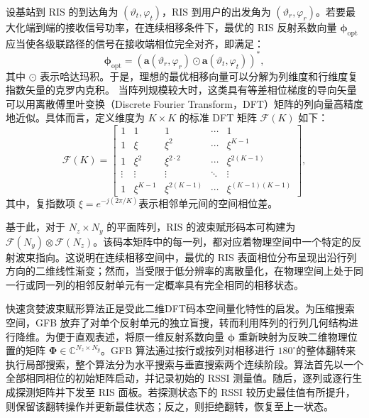设基站到 RIS 的到达角为 $(\vartheta_t, \varphi_t)$，RIS 到用户的出发角为 $(\vartheta_r, \varphi_r)$。若要最大化端到端的接收信号功率，在连续相移条件下，最优的 RIS 反射系数向量 $\bm{\phi}_{\text{opt}}$ 应当使各级联路径的信号在接收端相位完全对齐，即满足：
\begin{equation}\label{eq:ris_opt_continuous_phi}
	\bm{\phi}_{\text{opt}} = \left( \bm{a}(\vartheta_r, \varphi_r) \odot \bm{a}(\vartheta_t, \varphi_t) \right)^*,
\end{equation}
其中 $\odot$ 表示哈达玛积。于是，理想的最优相移向量可以分解为列维度和行维度复指数矢量的克罗内克积。
当阵列规模较大时，这类具有等差相位梯度的导向矢量可以用离散傅里叶变换（Discrete Fourier Transform，DFT）矩阵的列向量高精度地近似\cite{yin2013coordinated,adhikary2013joint}。具体而言，定义维度为 $K \times K$ 的标准 DFT 矩阵 $\mathcal{F}(K)$ 如下：
\begin{equation}
	\mathcal{F}(K) = \begin{bmatrix}
		1 & 1 & 1 & \cdots & 1 \\
		1 & \xi & \xi^{2} & \cdots & \xi^{K-1} \\
		1 & \xi^{2} & \xi^{2 \cdot 2} & \cdots & \xi^{2(K-1)} \\
		\vdots & \vdots & \vdots & \ddots & \vdots \\
		1 & \xi^{K-1} & \xi^{2(K-1)} & \cdots & \xi^{(K-1)(K-1)}
	\end{bmatrix},
\end{equation}
其中，复指数项 $\xi = e^{-j(2\pi/K)}$表示相邻单元间的空间相位差。


基于此，对于 $N_z \times N_y$ 的平面阵列，RIS 的波束赋形码本可构建为 $\mathcal{F}(N_y) \otimes \mathcal{F}(N_z)$。该码本矩阵中的每一列，都对应着物理空间中一个特定的反射波束指向。这说明在连续相移空间中，最优的 RIS 表面相位分布呈现出沿行列方向的二维线性渐变；然而，当受限于低分辨率的离散量化，在物理空间上处于同一行或同一列的相邻反射单元有一定概率具有完全相同的相移状态。

快速贪婪波束赋形算法正是受此二维DFT码本空间量化特性的启发。为压缩搜索空间，GFB 放弃了对单个反射单元的独立盲搜，转而利用阵列的行列几何结构进行降维。为便于直观表述，将原一维反射系数向量 $\bm{\phi}$ 重新映射为反映二维物理位置的矩阵 $\bm{\Phi} \in \mathbb{C}^{N_z \times N_y}$。GFB 算法通过按行或按列对相移进行 $180^\circ$的整体翻转来执行局部搜索，整个算法分为水平搜索与垂直搜索两个连续阶段。算法首先以一个全部相同相位的初始矩阵启动，并记录初始的 RSSI 测量值。随后，逐列或逐行生成探测矩阵并下发至 RIS 面板。若探测状态下的 RSSI 较历史最佳值有所提升，则保留该翻转操作并更新最佳状态；反之，则拒绝翻转，恢复至上一状态。


